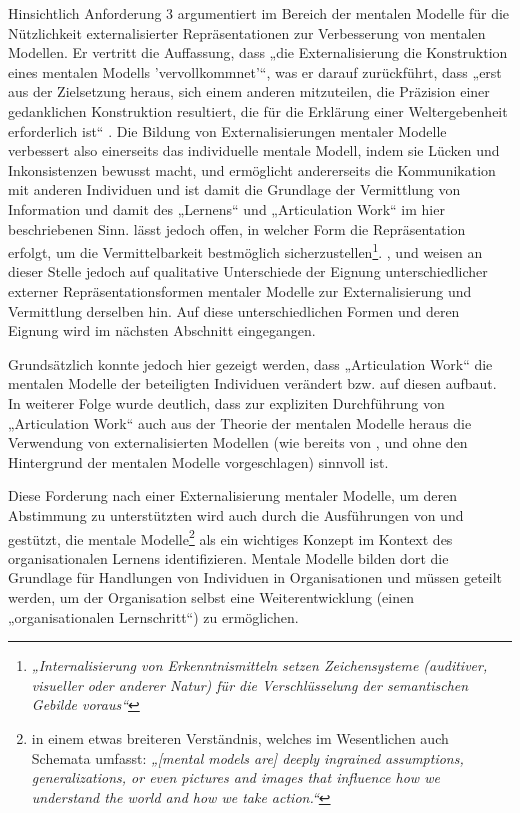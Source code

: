 Hinsichtlich \wichtig Anforderung 3 argumentiert \citet{Seel91} im Bereich der mentalen Modelle für die Nützlichkeit externalisierter Repräsentationen zur Verbesserung von mentalen Modellen. Er vertritt die Auffassung, dass „die Externalisierung die Konstruktion eines mentalen Modells 'vervollkommnet'“, was er darauf zurückführt, dass „erst aus der Zielsetzung heraus, sich einem anderen mitzuteilen, die Präzision einer gedanklichen Konstruktion resultiert, die für die Erklärung einer Weltergebenheit erforderlich ist“ \citep[][S. 155]{Seel91}. Die Bildung von Externalisierungen mentaler Modelle verbessert also einerseits das individuelle mentale Modell, indem sie Lücken und Inkonsistenzen bewusst macht, und ermöglicht andererseits die Kommunikation mit anderen Individuen und ist damit die Grundlage der Vermittlung von Information und damit des „Lernens“ und „Articulation Work“ im hier beschriebenen Sinn. \citet{Seel91} lässt jedoch offen, in welcher Form die Repräsentation erfolgt, um die Vermittelbarkeit bestmöglich sicherzustellen\footnote{\emph{„Internalisierung von Erkenntnismitteln setzen Zeichensysteme (auditiver, visueller oder anderer Natur) für die Verschlüsselung der semantischen Gebilde voraus“}\citep[][S. 155]{Seel91}}. \citet{Ifenthaler06}, \citet{Hanke06} und \citet{Pirnay-Dummer06} weisen an dieser Stelle jedoch auf qualitative Unterschiede der Eignung unterschiedlicher externer Repräsentationsformen mentaler Modelle zur Externalisierung und Vermittlung derselben hin. Auf diese unterschiedlichen Formen und deren Eignung wird im nächsten Abschnitt eingegangen. 

Grundsätzlich konnte jedoch hier gezeigt werden, dass „Articulation Work“ die mentalen Modelle der beteiligten Individuen verändert bzw. auf diesen aufbaut. In weiterer Folge wurde deutlich, dass zur expliziten Durchführung von „Articulation Work“ auch aus der Theorie der mentalen Modelle heraus die Verwendung von externalisierten Modellen (wie bereits von \citet{Divitini00}, \citet{Herrmann02} und \citet{Jorgensen04} ohne den Hintergrund der mentalen Modelle vorgeschlagen) sinnvoll ist.

Diese Forderung nach einer Externalisierung mentaler Modelle, um deren Abstimmung zu unterstützten wird auch durch die Ausführungen von \citet{Senge90} und \citet{Kim93} gestützt, die mentale Modelle\footnote{in einem etwas breiteren Verständnis, welches im Wesentlichen auch Schemata umfasst: \emph{„[mental models are] deeply ingrained assumptions, generalizations, or even pictures and images that influence how we understand the world and how we take action.“}\citet{Senge90}} als ein wichtiges Konzept im Kontext des organisationalen Lernens identifizieren. Mentale Modelle bilden dort die Grundlage für Handlungen von Individuen in Organisationen und müssen geteilt werden, um der Organisation selbst eine Weiterentwicklung (einen „organisationalen Lernschritt“) zu ermöglichen.

